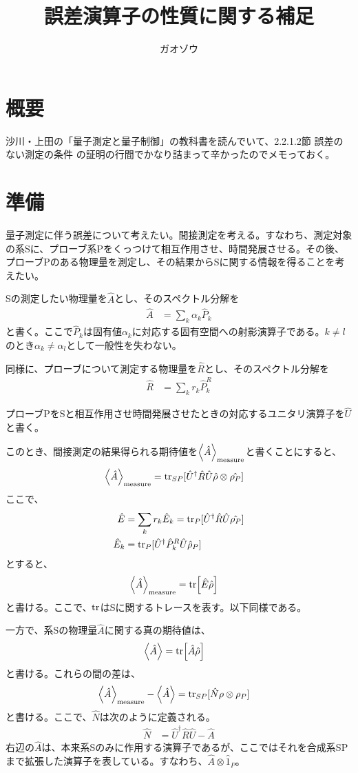 \documentclass[uplatex,dvipdfmx, a4j]{jsarticle}
\title{誤差演算子の性質に関する補足}
\author{ガオゾウ}
\newcommand{\ope}[1]{\hat{#1}}
\newcommand{\proj}{\ope{P}}
\newcommand{\hc}[1]{{\ope{#1}}^\dagger}
\newcommand{\expms}[1]{\expval{#1}_{\mathrm{measure}}}
\begin{document}
\maketitle
\section{概要}
沙川・上田の「量子測定と量子制御」の教科書を読んでいて、2.2.1.2節 誤差のない測定の条件 の証明の行間でかなり詰まって辛かったのでメモっておく。

\section{準備}
量子測定に伴う誤差について考えたい。間接測定を考える。すなわち、測定対象の系Sに、プローブ系Pをくっつけて相互作用させ、時間発展させる。その後、プローブPのある物理量を測定し、その結果からSに関する情報を得ることを考えたい。

Sの測定したい物理量を$\ope{A}$とし、そのスペクトル分解を
\begin{align}
	\ope{A} &= \sum_k \alpha_k\proj_k
\end{align}
と書く。ここで$\proj_k$は固有値$\alpha_k$に対応する固有空間への射影演算子である。$k\neq l$のとき$\alpha_k\neq\alpha_l$として一般性を失わない。

同様に、プローブについて測定する物理量を$\ope{R}$とし、そのスペクトル分解を
\begin{align}
	\ope{R} &= \sum_k r_k\proj_k^R
\end{align}

プローブPをSと相互作用させ時間発展させたときの対応するユニタリ演算子を$\ope{U}$と書く。

このとき、間接測定の結果得られる期待値を$\expms{\ope{A}}$と書くことにすると、
\begin{align}
	\expms{\ope{A}} &= \tr_{SP}[\hc{U}\ope{R}\ope{U}\ope{\rho}\otimes\ope{\rho_P}] 
\end{align}
ここで、
\begin{align}
	\ope{E} &= \sum_k r_k \ope{E}_k = \tr_P[\hc{U}\ope{R}\ope{U}\ope{\rho_P}] \\
	\ope{E}_k &= \tr_P[\hc{U}\proj_k^R\ope{U}\ope{\rho}_P]
\end{align}
とすると、
\begin{align}
	\expms{\ope{A}} &= \tr[\ope{E}\ope{\rho}]
\end{align}
と書ける。ここで、$\tr$はSに関するトレースを表す。以下同様である。

一方で、系Sの物理量$\ope{A}$に関する真の期待値は、
\begin{align}
	\expval{\ope{A}} &= \tr[\ope{A}\ope{\rho}]
\end{align}
と書ける。これらの間の差は、
\begin{align}
	\expms{\ope{A}} - \expval{\ope{A}} &= \tr_{SP}[\ope{N}\rho\otimes\rho_P]
\end{align}
と書ける。ここで、$\ope{N}$は次のように定義される。
\begin{align}
	\ope{N} &= \hc{U}\ope{R}\ope{U} - \ope{A}
\end{align}
右辺の$\ope{A}$は、本来系Sのみに作用する演算子であるが、ここではそれを合成系SPまで拡張した演算子を表している。すなわち、$\ope{A}\otimes\ope{1}_P$。
\end{document}
